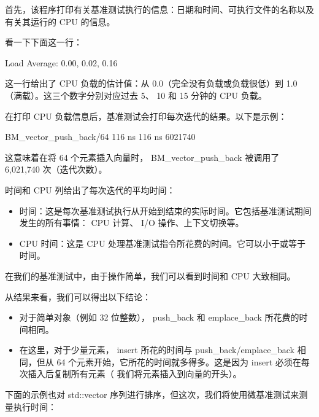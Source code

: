首先，该程序打印有关基准测试执行的信息：日期和时间、可执行文件的名称以及有关其运行的 CPU 的信息。

看一下下面这一行：

\begin{shell}
Load Average: 0.00, 0.02, 0.16
\end{shell}

这一行给出了 CPU 负载的估计值：从 0.0（完全没有负载或负载很低）到 1.0（满载）。这三个数字分别对应过去 5、 10 和 15 分钟的 CPU 负载。

在打印 CPU 负载信息后，基准测试会打印每次迭代的结果。以下是示例：

\begin{shell}
BM_vector_push_back/64     116 ns         116 ns      6021740
\end{shell}

这意味着在将 64 个元素插入向量时， BM\_vector\_push\_back 被调用了 6,021,740 次（迭代次数）。

时间和 CPU 列给出了每次迭代的平均时间：

\begin{itemize}
\item
时间：这是每次基准测试执行从开始到结束的实际时间。它包括基准测试期间发生的所有事情： CPU 计算、 I/O 操作、上下文切换等。

\item
CPU 时间：这是 CPU 处理基准测试指令所花费的时间。它可以小于或等于时间。
\end{itemize}

在我们的基准测试中，由于操作简单，我们可以看到时间和 CPU 大致相同。

从结果来看，我们可以得出以下结论：

\begin{itemize}
\item
对于简单对象（例如 32 位整数）， push\_back 和 emplace\_back 所花费的时间相同。

\item
在这里，对于少量元素， insert 所花的时间与 push\_back/emplace\_back 相同，但从 64 个元素开始，它所花的时间就多得多。这是因为 insert 必须在每次插入后复制所有元素（ 我们将元素插入到向量的开头）。
\end{itemize}

下面的示例也对 std::vector 序列进行排序，但这次，我们将使用微基准测试来测量执行时间：

